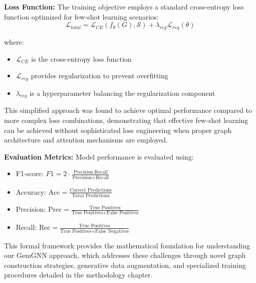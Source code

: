 \textbf{Loss Function:} The training objective employs a standard cross-entropy loss function optimized for few-shot learning scenarios:
\begin{equation}
\mathcal{L}_{total} = \mathcal{L}_{CE}(f_{\theta}(G), \mathcal{S}) + \lambda_{reg} \mathcal{L}_{reg}(\theta)
\end{equation}

where:
\begin{itemize}
\item $\mathcal{L}_{CE}$ is the cross-entropy loss function
\item $\mathcal{L}_{reg}$ provides regularization to prevent overfitting
\item $\lambda_{reg}$ is a hyperparameter balancing the regularization component
\end{itemize}

This simplified approach was found to achieve optimal performance compared to more complex loss combinations, demonstrating that effective few-shot learning can be achieved without sophisticated loss engineering when proper graph architecture and attention mechanisms are employed.

\textbf{Evaluation Metrics:} Model performance is evaluated using:
\begin{itemize}
\item F1-score: $F1 = 2 \cdot \frac{\text{Precision} \cdot \text{Recall}}{\text{Precision} + \text{Recall}}$
\item Accuracy: $\text{Acc} = \frac{\text{Correct Predictions}}{\text{Total Predictions}}$
\item Precision: $\text{Prec} = \frac{\text{True Positives}}{\text{True Positives} + \text{False Positives}}$
\item Recall: $\text{Rec} = \frac{\text{True Positives}}{\text{True Positives} + \text{False Negatives}}$
\end{itemize}

This formal framework provides the mathematical foundation for understanding our GemGNN approach, which addresses these challenges through novel graph construction strategies, generative data augmentation, and specialized training procedures detailed in the methodology chapter.

\EndChapter
